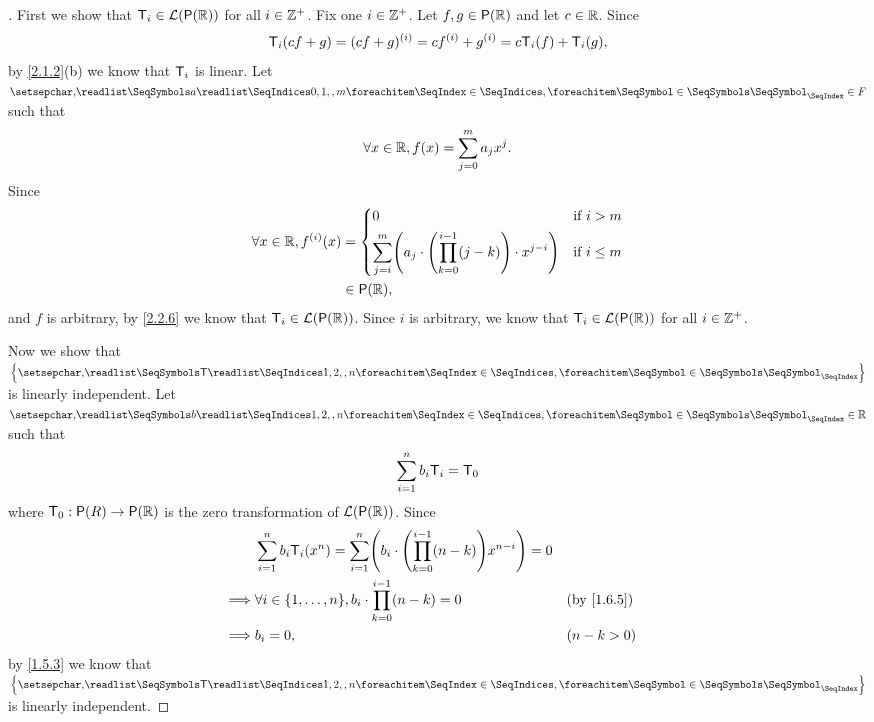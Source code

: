 \begin{proof}[]
  First we show that \(\T_i \in \ls(\ps{\R})\) for all \(i \in \mathbb{Z}^+\).
  Fix one \(i \in \mathbb{Z}^+\).
  Let \(f, g \in \ps{\R}\) and let \(c \in \mathbb{R}\).
  Since
  \[
    \mathsf{T}_i(cf + g) = (cf + g)^{(i)} = c f^{(i)} + g^{(i)} = c \mathsf{T}_i(f) + \mathsf{T}_i(g),
  \]
  by \cref{2.1.2}(b) we know that \(\mathsf{T}_i\) is linear.
  Let \(\seq{a}{0,1,,m} \in \F\) such that
  \[
    \forall x \in \mathbb{R}, f(x) = \sum_{j = 0}^m a_j x^j.
  \]
  Since
  \begin{align*}
    \forall x \in \R, f^{(i)}(x) & = \begin{dcases}
                                       0                                                                                & \text{if } i > m    \\
                                       \sum_{j = i}^m \pa{a_j \cdot \pa{\prod_{k = 0}^{i - 1} (j - k)} \cdot x^{j - i}} & \text{if } i \leq m
                                     \end{dcases} \\
                                 & \in \ps{\R},
  \end{align*}
  and \(f\) is arbitrary, by \cref{2.2.6} we know that \(\T_i \in \ls(\ps{\R})\).
  Since \(i\) is arbitrary, we know that \(\T_i \in \ls(\ps{\R})\) for all \(i \in \mathbb{Z}^+\).

  Now we show that \(\set{\seq{\T}{1,2,,n}}\) is linearly independent.
  Let \(\seq{b}{1,2,,n} \in \R\) such that
  \[
    \sum_{i = 1}^n b_i \mathsf{T}_i = \mathsf{T}_0
  \]
  where \(\zT : \ps{R} \to \ps{\R}\) is the zero transformation of \(\ls(\ps{\R})\).
  Since
  \begin{align*}
             & \sum_{i = 1}^n b_i \T_i(x^n) = \sum_{i = 1}^n \pa{b_i \cdot \pa{\prod_{k = 0}^{i - 1} (n - k)} x^{n - i}} = 0                               \\
    \implies & \forall i \in \set{1, \dots, n}, b_i \cdot \prod_{k = 0}^{i - 1} (n - k) = 0                                  &  & \text{(by \cref{1.6.5})} \\
    \implies & b_i = 0,                                                                                                      &  & (n - k > 0)
  \end{align*}
  by \cref{1.5.3} we know that \(\set{\seq{\T}{1,2,,n}}\) is linearly independent.
\end{proof}
